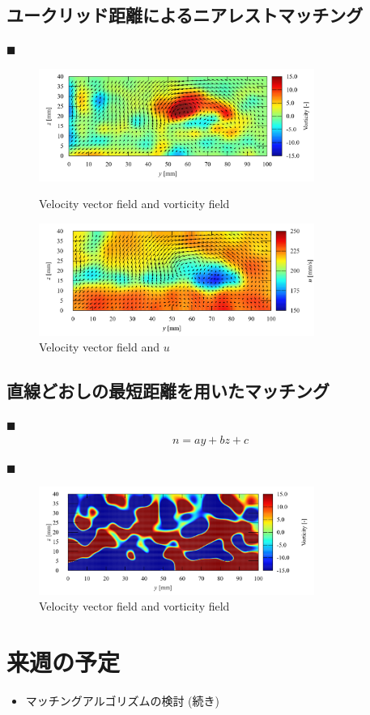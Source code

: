\documentclass[twocolumn,a4j]{jsarticle}
\begin{document}
\newpage
\subsection{ユークリッド距離によるニアレストマッチング}
$\blacksquare$\;
\begin{figure}[htbp]
  \centering
  \includegraphics[width=90mm]{../images/vorticity.png}
  \caption{Velocity vector field and vorticity field}
  \includegraphics[width=90mm]{../images/velocity.png}
  \caption{Velocity vector field and $u$}
\end{figure}

\subsection{直線どおしの最短距離を用いたマッチング}
$\blacksquare$\;
\begin{eqnarray*}
  n = a y + b z + c
\end{eqnarray*}

$\blacksquare$\;
\begin{figure}[htbp]
  \centering
  \includegraphics[width=90mm]{../images/vorticity_miss.png}
  \caption{Velocity vector field and vorticity field}
\end{figure}

\section{来週の予定}
\begin{itemize}
  \item マッチングアルゴリズムの検討 (続き)
\end{itemize}
\end{document}
